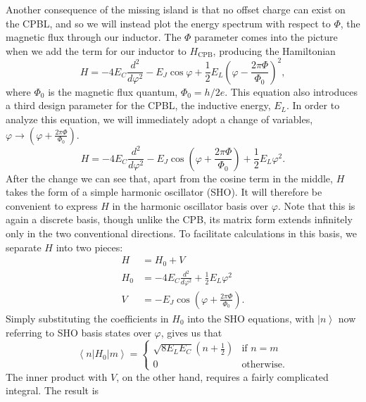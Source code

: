 \documentclass[twocolumn]{revtex4}
\newcommand{\ket}[1]{\left| #1 \right>}
\newcommand{\innerp}[3]{\textstyle\left< #1 \left| #2 \right| #3 \right>}
\begin{document}
Another consequence of the missing island is that no offset charge can
exist on the CPBL, and so we will instead plot the energy spectrum
with respect to $\Phi$, the magnetic flux through our inductor. The
$\Phi$ parameter comes into the picture when we add the term for our
inductor to $H_{\text{CPB}}$, producing the Hamiltonian
\begin{equation}
  H = -4E_C\frac{d^2}{d\varphi^2}-E_J\cos{\varphi}+\frac{1}{2}
  E_L\left(\varphi-\frac{2\pi\Phi}{\Phi_0} \right)^2,
\end{equation}
where $\Phi_0$ is the magnetic flux quantum, $\Phi_0 = h/2e$. This
equation also introduces a third design parameter for the CPBL, the
inductive energy, $E_L$. In order to analyze this equation, we will
immediately adopt a change of variables, $\varphi \rightarrow (\varphi
+ \frac{2\pi\Phi}{\Phi_0})$.
\begin{equation}
  \label{H}
  H = -4E_C\frac{d^2}{d\varphi^2}-E_J\cos\left(\varphi+
    \frac{2\pi\Phi}{\Phi_0}\right)+
  \frac{1}{2} E_L\varphi^2.
\end{equation}
After the change we can see that, apart from the cosine term in the
middle, $H$ takes the form of a simple harmonic oscillator (SHO). It
will therefore be convenient to express $H$ in the harmonic oscillator
basis over $\varphi$. Note that this is again a discrete basis, though
unlike the CPB, its matrix form extends infinitely only in the two
conventional directions. To facilitate calculations in this basis, we
separate $H$ into two pieces:
\begin{align}
  H & = H_0 + V\\
  H_0 & = -4E_C\frac{d^2}{d\varphi^2} +
  \frac{1}{2} E_L\varphi^2 \\
  V & = -E_J\cos\left(\varphi + \frac{2\pi\Phi}{\Phi_0}\right).
\end{align}
Simply substituting the coefficients in $H_0$ into the SHO equations,
with $\ket{n}$ now referring to SHO basis states over $\varphi$, gives
us that
\begin{equation}
  \innerp{n}{H_0}{m} = 
  \begin{cases}
    \sqrt{8E_LE_C}\left(n+\frac{1}{2}\right) & \text{if $n=m$} \\
    0 & \text{otherwise.}
  \end{cases}
  \label{inner-H0}
\end{equation}
The inner product with $V$, on the other hand, requires a fairly
complicated integral. The result is
\end{document}
